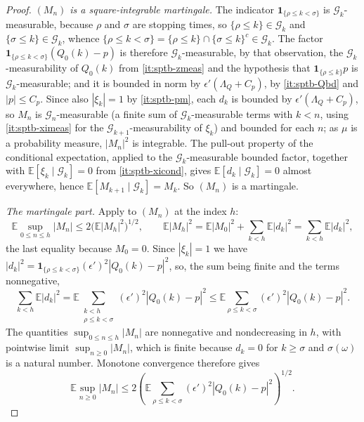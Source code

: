 \begin{proof}
\emph{$(M_n)$ is a square-integrable martingale.} The indicator
$\mathbf1_{\{\rho\le k<\sigma\}}$ is $\mathcal G_k$-measurable, because $\rho$
and $\sigma$ are stopping times, so $\{\rho\le k\}\in\mathcal G_k$ and
$\{\sigma\le k\}\in\mathcal G_k$, whence
$\{\rho\le k<\sigma\}=\{\rho\le k\}\cap\{\sigma\le k\}^c\in\mathcal G_k$. The
factor $\mathbf1_{\{\rho\le k<\sigma\}}(Q_0(k)-p)$ is therefore
$\mathcal G_k$-measurable, by that observation, the
$\mathcal G_k$-measurability of $Q_0(k)$ from \ref{it:sptb-zmeas} and the
hypothesis that $\mathbf1_{\{\rho\le k\}}p$ is $\mathcal G_k$-measurable; and it
is bounded in norm by $\epsilon'(\Lambda_Q+C_p)$, by \ref{it:sptb-Qbd} and
$|p|\le C_p$. Since also $|\xi_k|=1$ by \ref{it:sptb-pm}, each $d_k$ is bounded
by $\epsilon'(\Lambda_Q+C_p)$, so $M_n$ is $\mathcal G_n$-measurable (a finite
sum of $\mathcal G_k$-measurable terms with $k<n$, using
\ref{it:sptb-ximeas} for the $\mathcal G_{k+1}$-measurability of $\xi_k$) and
bounded for each $n$; as $\mu$ is a probability measure, $|M_n|^2$ is integrable.
The pull-out property of the conditional expectation, applied to the
$\mathcal G_k$-measurable bounded factor, together with
$\mathbb E[\xi_k\mid\mathcal G_k]=0$ from \ref{it:sptb-xicond}, gives
$\mathbb E[d_k\mid\mathcal G_k]=0$ almost everywhere, hence
$\mathbb E[M_{k+1}\mid\mathcal G_k]=M_k$. So $(M_n)$ is a martingale.

\emph{The martingale part.} Apply  to $(M_n)$ at the
index $h$:
\[
  \mathbb E\sup_{0\le n\le h}|M_n|\le2\bigl(\mathbb E|M_h|^2\bigr)^{1/2},
  \qquad
  \mathbb E|M_h|^2=\mathbb E|M_0|^2+\sum_{k<h}\mathbb E|d_k|^2
   =\sum_{k<h}\mathbb E|d_k|^2 ,
\]
the last equality because $M_0=0$. Since $|\xi_k|=1$ we have
$|d_k|^2=\mathbf1_{\{\rho\le k<\sigma\}}(\epsilon')^2|Q_0(k)-p|^2$, so, the sum
being finite and the terms nonnegative,
\[
  \sum_{k<h}\mathbb E|d_k|^2
   =\mathbb E\sum_{\substack{k<h\\ \rho\le k<\sigma}}
       (\epsilon')^2|Q_0(k)-p|^2
   \le\mathbb E\sum_{\rho\le k<\sigma}(\epsilon')^2|Q_0(k)-p|^2 .
\]
The quantities $\sup_{0\le n\le h}|M_n|$ are nonnegative and nondecreasing in
$h$, with pointwise limit $\sup_{n\ge0}|M_n|$, which is finite because $d_k=0$
for $k\ge\sigma$ and $\sigma(\omega)$ is a natural number. Monotone convergence
therefore gives
\begin{equation}\label{eq:sptb-doob}
  \mathbb E\sup_{n\ge0}|M_n|
   \le2\left(\mathbb E\sum_{\rho\le k<\sigma}
        (\epsilon')^2|Q_0(k)-p|^2\right)^{1/2}.
\end{equation}


\end{proof}
